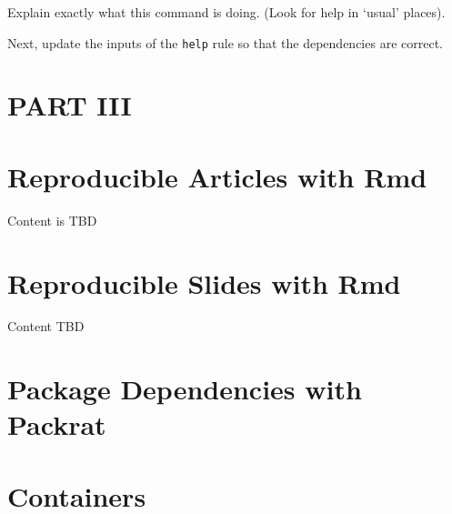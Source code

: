 \documentclass[]{book}
\theoremstyle{definition}
\theoremstyle{definition}
\theoremstyle{definition}
\theoremstyle{remark}
\begin{document}
Explain exactly what this command is doing. (Look for help in `usual'
places).

Next, update the inputs of the \texttt{help} rule so that the
dependencies are correct.

\chapter*{PART III}\label{part-iii}

\chapter{Reproducible Articles with
Rmd}\label{reproducible-articles-with-rmd}

Content is TBD

\chapter{Reproducible Slides with
Rmd}\label{reproducible-slides-with-rmd}

Content TBD

\chapter{Package Dependencies with
Packrat}\label{package-dependencies-with-packrat}

\chapter{Containers}\label{containers}


\end{document}

